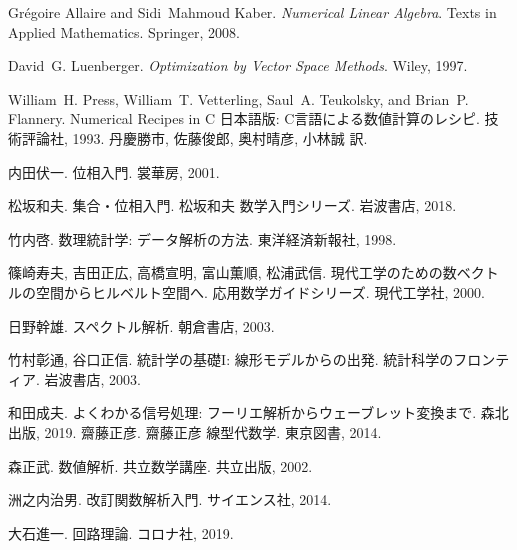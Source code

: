 \documentclass[../../main]{subfiles}
\begin{document}
\begin{thebibliography}{99}
    Grégoire Allaire and Sidi~Mahmoud Kaber.
    \newblock \emph{Numerical Linear Algebra}.
    \newblock Texts in Applied Mathematics. Springer, 2008.

    David~G. Luenberger.
    \newblock \emph{Optimization by Vector Space Methods}.
    \newblock Wiley, 1997.

    William~H. Press, William~T. Vetterling, Saul~A. Teukolsky, and Brian~P. Flannery.
    \newblock Numerical Recipes in C 日本語版: C言語による数値計算のレシピ.
    \newblock 技術評論社, 1993.
    \newblock 丹慶勝市, 佐藤俊郎, 奥村晴彦, 小林誠 訳.

    内田伏一.
    \newblock 位相入門.
    \newblock 裳華房, 2001.

    松坂和夫.
    \newblock 集合・位相入門.
    \newblock 松坂和夫 数学入門シリーズ. 岩波書店, 2018.

    竹内啓.
    \newblock 数理統計学: データ解析の方法.
    \newblock 東洋経済新報社, 1998.

    篠崎寿夫, 吉田正広, 高橋宣明, 富山薫順, 松浦武信.
    \newblock 現代工学のための数ベクトルの空間からヒルベルト空間へ.
    \newblock 応用数学ガイドシリーズ. 現代工学社, 2000.

    日野幹雄.
    \newblock スペクトル解析.
    \newblock 朝倉書店, 2003.

    竹村彰通, 谷口正信.
    \newblock 統計学の基礎I: 線形モデルからの出発.
    \newblock 統計科学のフロンティア. 岩波書店, 2003.

    和田成夫.
    \newblock よくわかる信号処理: フーリエ解析からウェーブレット変換まで.
    \newblock 森北出版, 2019.
    齋藤正彦.
    \newblock 齋藤正彦 線型代数学.
    \newblock 東京図書, 2014.

    森正武.
    \newblock 数値解析.
    \newblock 共立数学講座. 共立出版, 2002.

    洲之内治男.
    \newblock 改訂関数解析入門.
    \newblock サイエンス社, 2014.

    大石進一.
    \newblock 回路理論.
    \newblock コロナ社, 2019.
\end{thebibliography}
\end{document}
